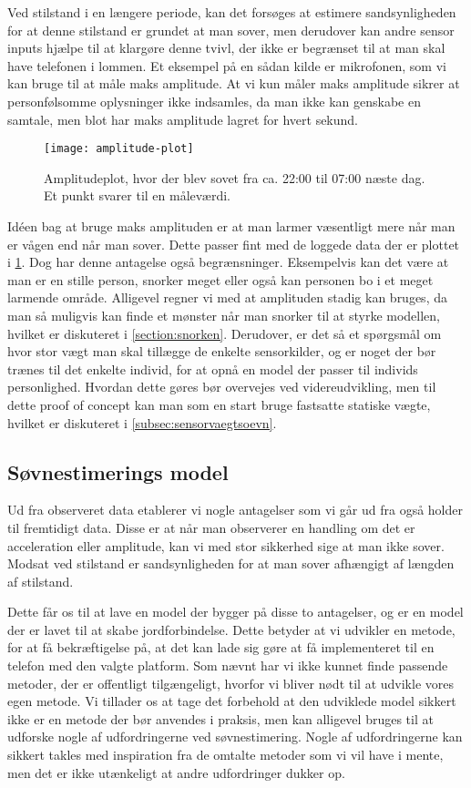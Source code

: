 Ved stilstand i en længere periode, kan det forsøges at estimere sandsynligheden for at denne stilstand er grundet at man sover, men derudover kan andre sensor inputs hjælpe til at klargøre denne tvivl, der ikke er begrænset til at man skal have telefonen i lommen.
Et eksempel på en sådan kilde er mikrofonen, som vi kan bruge til at måle maks amplitude.
At vi kun måler maks amplitude sikrer at personfølsomme oplysninger ikke indsamles, da man ikke kan genskabe en samtale, men blot har maks amplitude lagret for hvert sekund.

\begin{figure}[h]
	\centering
	\texttt{[image: amplitude-plot]}
	\caption{Amplitudeplot, hvor der blev sovet fra ca. 22:00 til 07:00 næste dag. Et punkt svarer til en måleværdi.}\label{fig:amplplot}
\end{figure}

Idéen bag at bruge maks amplituden er at man larmer væsentligt mere når man er vågen end når man sover.
Dette passer fint med de loggede data der er plottet i \cref{fig:amplplot}.
Dog har denne antagelse også begrænsninger.
Eksempelvis kan det være at man er en stille person, snorker meget eller også kan personen bo i et meget larmende område.
Alligevel regner vi med at amplituden stadig kan bruges, da man så muligvis kan finde et mønster når man snorker til at styrke modellen, hvilket er diskuteret i \cref{section:snorken}.
Derudover, er det så et spørgsmål om hvor stor vægt man skal tillægge de enkelte sensorkilder, og er noget der bør trænes til det enkelte individ, for at opnå en model der passer til individs personlighed.
Hvordan dette gøres bør overvejes ved videreudvikling, men til dette proof of concept kan man som en start bruge fastsatte statiske vægte, hvilket er diskuteret i \cref{subsec:sensorvaegtsoevn}.

\subsection{Søvnestimerings model}
Ud fra observeret data etablerer vi nogle antagelser som vi går ud fra også holder til fremtidigt data.
Disse er at når man observerer en handling om det er acceleration eller amplitude, kan vi med stor sikkerhed sige at man ikke sover.
Modsat ved stilstand er sandsynligheden for at man sover afhængigt af længden af stilstand.

Dette får os til at lave en model der bygger på disse to antagelser, og er en model der er lavet til at skabe jordforbindelse.
Dette betyder at vi udvikler en metode, for at få bekræftigelse på, at det kan lade sig gøre at få implementeret til en telefon med den valgte platform.
Som nævnt har vi ikke kunnet finde passende metoder, der er offentligt tilgængeligt, hvorfor vi bliver nødt til at udvikle vores egen metode.
Vi tillader os at tage det forbehold at den udviklede model sikkert ikke er en metode der bør anvendes i praksis, men kan alligevel bruges til at udforske nogle af udfordringerne ved søvnestimering.
Nogle af udfordringerne kan sikkert takles med inspiration fra de omtalte metoder som vi vil have i mente, men det er ikke utænkeligt at andre udfordringer dukker op.

